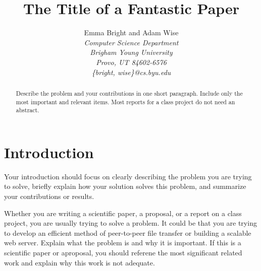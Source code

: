 \documentclass[11pt,onecolumn]{IEEEtran}
\begin{document}
\title{The Title of a Fantastic Paper}


\author{Emma Bright and Adam Wise\\
\it Computer Science Department\\
Brigham Young University\\
Provo, UT 84602-6576\\
\{bright, wise\}@cs.byu.edu
}



\maketitle



%
% 

\begin{abstract}

  Describe the problem and your contributions in one short paragraph.
  Include only the most important and relevant items.  Most reports
  for a class project do not need an abstract.

\end{abstract}

\section{Introduction}

Your introduction should focus on clearly describing the problem you
are trying to solve, briefly explain how your solution solves this
problem, and summarize your contributions or results.

Whether you are writing a scientific paper, a proposal, or a report on
a class project, you are usually trying to solve a problem.  It could
be that you are trying to develop an efficient method of peer-to-peer
file transfer or building a scalable web server.  Explain what the
problem is and why it is important.  If this is a scientific paper or
aproposal, you should referene the most significant related work and
explain why this work is not adequate.
\end{document}
